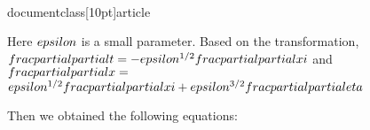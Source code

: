 \\documentclass[10pt]{article}
\begin{document}
{{{{{Here $\\epsilon$ is a small parameter. Based on the transformation, $\\frac{\\partial}{\\partial t}=-\\epsilon^{1 / 2} \\frac{\\partial}{\\partial \\xi}$ and $\\frac{\\partial}{\\partial x}=$ $\\epsilon^{1 / 2} \\frac{\\partial}{\\partial \\xi}+\\epsilon^{3 / 2} \\frac{\\partial}{\\partial \\eta}$

Then we obtained the following equations:


}}}}}
\end{document}
